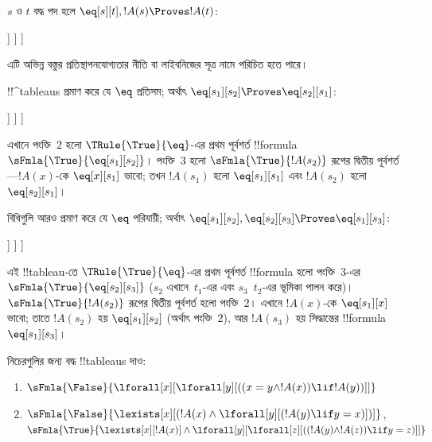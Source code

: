 \documentclass[../../../include/open-logic-section]{subfiles}
\begin{document}
\begin{ex}
$s$ ও $t$ বদ্ধ পদ হলে
$\eq[s][t], !A(s) \Proves !A(t)$:
\begin{oltableau}
  [\sFmla{\False}{\formula{A}(t)}, just = \TAss
    [\sFmla{\True}{\eq[s][t]}, just = \TAss
      [\sFmla{\True}{\formula{A}(s)}, just = \TAss
        [\sFmla{\True}{\formula{A}(t)}, just={\TRule{\True}{\eq}[2, 3]}, close]
      ]
    ]
  ]
\end{oltableau}
এটি অভিন্ন বস্তুর প্রতিস্থাপনযোগ্যতার নীতি বা লাইবনিজের সূত্র নামে
পরিচিত হতে পারে।

!!^{tableau}s প্রমাণ করে যে $\eq$ প্রতিসম; অর্থাৎ
$\eq[s_1][s_2] \Proves \eq[s_2][s_1]$:
\begin{oltableau}
  [\sFmla{\False}{\eq[s_2][s_1]}, just = \TAss
    [\sFmla{\True}{\eq[s_1][s_2]}, just = \TAss
      [\sFmla{\True}{\eq[s_1][s_1]}, just = {$\eq$}
        [\sFmla{\True}{\eq[s_2][s_1]}, just = {\TRule{\True}{\eq}[2, 3]}, close]
      ]
    ]
  ]
\end{oltableau}
এখানে পংক্তি~$2$ হলো $\TRule{\True}{\eq}$-এর প্রথম পূর্বশর্ত
!!{formula}~$\sFmla{\True}{\eq[s_1][s_2]}$। পংক্তি~$3$ হলো
$\sFmla{\True}{!A(s_2)}$ রূপের দ্বিতীয় পূর্বশর্ত—$!A(x)$-কে
$\eq[x][s_1]$ ভাবো; তখন $!A(s_1)$ হলো $\eq[s_1][s_1]$ এবং
$!A(s_2)$ হলো $\eq[s_2][s_1]$।

বিধিগুলি আরও প্রমাণ করে যে $\eq$ পরিযায়ী; অর্থাৎ
$\eq[s_1][s_2], \eq[s_2][s_3] \Proves \eq[s_1][s_3]$:
\begin{oltableau}
  [\sFmla{\False}{\eq[s_1][s_3]}, just = \TAss
    [\sFmla{\True}{\eq[s_1][s_2]}, just = \TAss
      [\sFmla{\True}{\eq[s_2][s_3]}, just = \TAss
        [\sFmla{\True}{\eq[s_1][s_3]}, just = {\TRule{\True}{\eq}[3, 2]}, close]
      ]
    ]
  ]
\end{oltableau}
এই !!{tableau}-তে $\TRule{\True}{\eq}$-এর প্রথম পূর্বশর্ত
!!{formula} হলো পংক্তি~$3$-এর $\sFmla{\True}{\eq[s_2][s_3]}$
($s_2$ এখানে~$t_1$-এর এবং $s_3$~$t_2$-এর ভূমিকা পালন করে)।
$\sFmla{\True}{!A(s_2)}$ রূপের দ্বিতীয় পূর্বশর্ত হলো পংক্তি~$2$।
এখানে $!A(x)$-কে $\eq[s_1][x]$ ভাবো; তাতে $!A(s_2)$ হয়
$\eq[s_1][s_2]$ (অর্থাৎ পংক্তি~$2$), আর $!A(s_3)$ হয় সিদ্ধান্তের
!!{formula}~$\eq[s_1][s_3]$।
\end{ex}

\begin{prob}
নিচেরগুলির জন্য বদ্ধ !!{tableau}s দাও:
\begin{enumerate}
\item $\sFmla{\False}{\lforall[x][\lforall[y][((x = y \land !A(x))
      \lif !A(y))]]}$
\item $\sFmla{\False}{\lexists[x][(!A(x) \land
    \lforall[y][(!A(y) \lif y = x)])]}$,\\
  $\sFmla{\True}{\lexists[x][!A(x)] \land
    \lforall[y][\lforall[z][((!A(y) \land !A(z)) \lif y = z)]]}$
\end{enumerate}
\end{prob}
\end{document}
